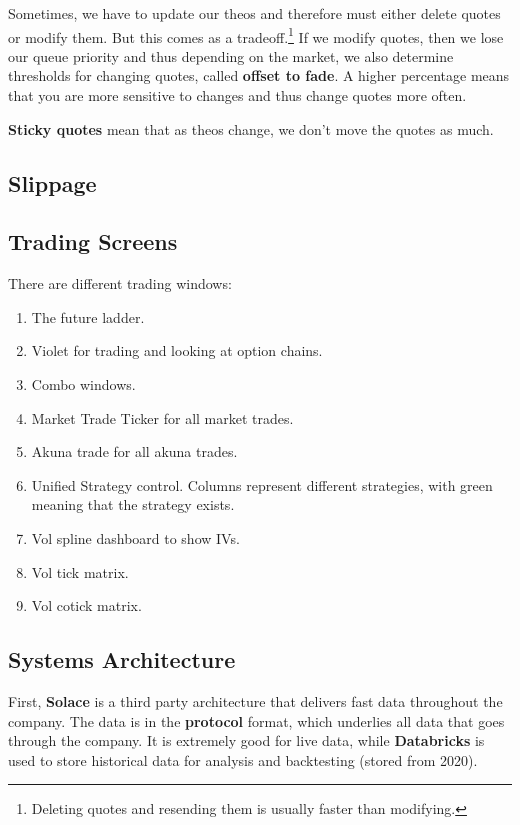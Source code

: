 \documentclass{article}
\begin{document}
    \begin{definition}
      Sometimes, we have to update our theos and therefore must either delete quotes or modify them. But this comes as a tradeoff.\footnote{Deleting quotes and resending them is usually faster than modifying.} If we modify quotes, then we lose our queue priority and thus depending on the market, we also determine thresholds for changing quotes, called \textbf{offset to fade}. A higher percentage means that you are more sensitive to changes and thus change quotes more often. 

      \textbf{Sticky quotes} mean that as theos change, we don't move the quotes as much. 
    \end{definition}

  \subsection{Slippage}

  \subsection{Trading Screens}

    There are different trading windows: 
    \begin{enumerate}
      \item The future ladder. 
      \item Violet for trading and looking at option chains. 
      \item Combo windows. 
      \item Market Trade Ticker for all market trades. 
      \item Akuna trade for all akuna trades. 
      \item Unified Strategy control. Columns represent different strategies, with green meaning that the strategy exists. 
      \item Vol spline dashboard to show IVs. 
      \item Vol tick matrix. 
      \item Vol cotick matrix. 
    \end{enumerate}

  \subsection{Systems Architecture}

    First, \textbf{Solace} is a third party architecture that delivers fast data throughout the company. The data is in the \textbf{protocol} format, which underlies all data that goes through the company. It is extremely good for live data, while \textbf{Databricks} is used to store historical data for analysis and backtesting (stored from 2020).
\end{document}
